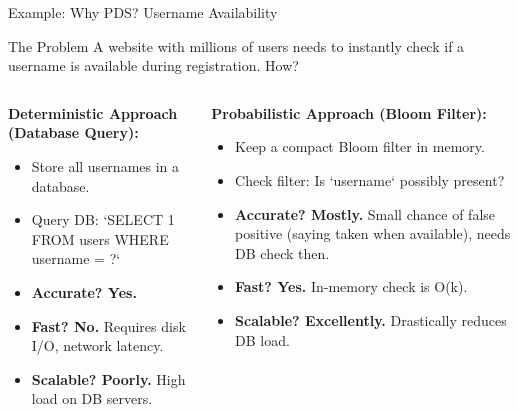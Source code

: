 \begin{frame}{Example: Why PDS? Username Availability}
  \begin{block}{The Problem}
    A website with millions of users needs to instantly check if a username is available during registration. How?
  \end{block}

  \begin{columns}
    \begin{column}{0.5\textwidth}
      \textbf{Deterministic Approach (Database Query):}
      \begin{itemize}
        \item Store all usernames in a database.
        \item Query DB: `SELECT 1 FROM users WHERE username = ?`
        \item \textbf{Accurate? Yes.}
        \item \textbf{Fast? No.} Requires disk I/O, network latency.
        \item \textbf{Scalable? Poorly.} High load on DB servers.
      \end{itemize}
    \end{column}
    \begin{column}{0.5\textwidth}
      \textbf{Probabilistic Approach (Bloom Filter):}
      \begin{itemize}
        \item Keep a compact Bloom filter in memory.
        \item Check filter: Is `username` possibly present?
        \item \textbf{Accurate? Mostly.} Small chance of false positive (saying taken when available), needs DB check then.
        \item \textbf{Fast? Yes.} In-memory check is O(k).
        \item \textbf{Scalable? Excellently.} Drastically reduces DB load.
      \end{itemize}
    \end{column}
  \end{columns}
\end{frame}

